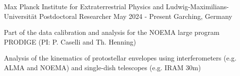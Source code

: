 \vspace{10pt}

\begin{cventries}
	
	\cventry
	{Max Planck Institute for Extraterrestrial Physics and Ludwig-Maximilians-Universit\"at} %
	{Postdoctoral Researcher} %
	{May 2024 - Present} %
	{Garching, Germany} %
	{ \begin{cvitems} %
			\item{Part of the data calibration and analysis for the NOEMA large program PRODIGE (PI: P. Caselli and Th. Henning)}
			\item{Analysis of the kinematics of protostellar envelopes using interferometers (e.g. ALMA and NOEMA) and single-dish telescopes (e.g. IRAM 30m)}
		\end{cvitems}
	}
	
	
\end{cventries}